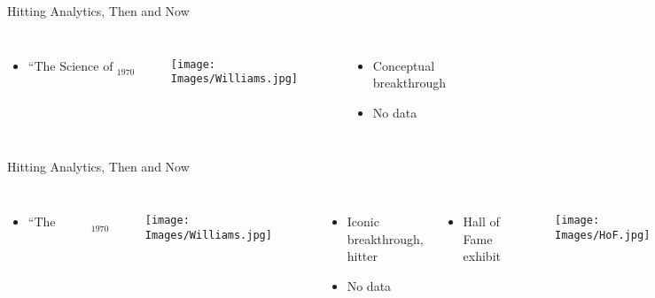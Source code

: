 \documentclass{beamer}
\begin{document}
\begin{frame}{Hitting Analytics, Then and Now} %
\begin{columns}
\begin{itemize}
\item $\text{``The Science of Hitting''}_{\text{1970}}$
\end{itemize}

        \begin{figure}[H]
      	\centering
      	\texttt{[image: Images/Williams.jpg]}
      	\end{figure}
      
\begin{itemize}
\item Conceptual breakthrough
\item No data
\end{itemize}


\end{columns}
\end{frame}

\begin{frame}{Hitting Analytics, Then and Now} %
\begin{columns}
\begin{itemize}
\item $\text{``The Science of Hitting''}_{\text{1970}}$
\end{itemize}

        \begin{figure}[H]
      	\centering
      	\texttt{[image: Images/Williams.jpg]}
      	\end{figure}
      
\begin{itemize}
\item Iconic breakthrough, hitter
\item No data
\end{itemize}

\begin{itemize}
\item Hall of Fame exhibit
\end{itemize}
  \begin{figure}[H]
	\centering
	\texttt{[image: Images/HoF.jpg]}
	\end{figure}
\begin{itemize}
\item Baseball fanatic statistician
\item PITCHf/x data!
\end{itemize}

\end{columns}
\end{frame}
\end{document}
